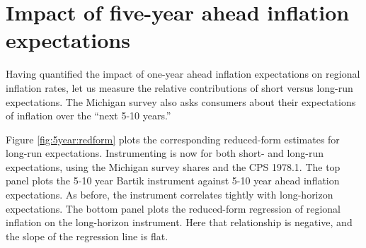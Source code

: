 \documentclass[12pt]{article}
\begin{document}
\section{Impact of five-year ahead inflation expectations}


Having quantified the impact of one-year ahead inflation expectations on regional inflation rates, let us measure the relative contributions of short versus long-run expectations. The Michigan survey also asks consumers about their expectations of inflation over the ``next 5-10 years.'' 

Figure \ref{fig:5year:redform} plots the corresponding reduced-form estimates for long-run expectations. Instrumenting is now for both short- and long-run expectations, using the Michigan survey shares and the CPS 1978.1. The top panel plots the 5-10 year Bartik instrument against 5-10 year ahead inflation expectations. As before, the instrument correlates tightly with long-horizon expectations. The bottom panel plots the reduced-form regression of regional inflation on the long-horizon instrument. Here that relationship is negative, and the slope of the regression line is flat.  
\end{document}
